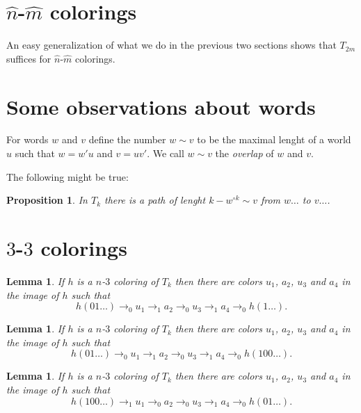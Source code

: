 \documentclass[a4paper]{article}
\newtheorem{lemma}[theorem]{Lemma}
\newtheorem{proposition}[theorem]{Proposition}
\begin{document}
\section{$\hat{n}$-$\hat{m}$ colorings}

An easy generalization of what we do in the previous two sections shows
that $T_{2m}$ suffices for $\hat{n}$-$\hat{m}$ colorings.


\section{Some observations about words}

\newcommand{\ol}[2]{{#1}\sim{#2}}

For words $w$ and $v$ define the number $\ol{w}{v}$ to be the maximal
lenght of a world $u$ such that $w = w' u$ and $v = u v'$. We call
$\ol{w}{v}$ the \emph{overlap} of $w$ and $v$.

The following might be true:
\begin{proposition}
 In $T_k$ there is a path of lenght $k - \ol{w^{\circ k}}{v}$ from $w\dots$ to $v\dots$.
\end{proposition}


\section{$3$-$3$ colorings}

\begin{lemma} \label{three one}
 If $h$ is a $n$-$3$ coloring of $T_k$ then there are colors $u_1$,
$a_2$, $u_3$ and $a_4$ in the image of $h$ such that
\[
 h(01\dots) \rightarrow_0 u_1 \rightarrow_1 a_2 \rightarrow_0 u_3
\rightarrow_1 a_4 \rightarrow_0 h(1\dots).
\]
\end{lemma}
\begin{lemma} \label{three one}
 If $h$ is a $n$-$3$ coloring of $T_k$ then there are colors $u_1$,
$a_2$, $u_3$ and $a_4$ in the image of $h$ such that
\[
 h(01\dots) \rightarrow_0 u_1 \rightarrow_1 a_2 \rightarrow_0 u_3
\rightarrow_1 a_4 \rightarrow_0 h(100\dots).
\]
\end{lemma}
\begin{lemma} \label{three one}
 If $h$ is a $n$-$3$ coloring of $T_k$ then there are colors $u_1$,
$a_2$, $u_3$ and $a_4$ in the image of $h$ such that
\[
 h(100\dots) \rightarrow_1 u_1 \rightarrow_0 a_2 \rightarrow_0 u_3
\rightarrow_1 a_4 \rightarrow_0 h(01\dots).
\]
\end{lemma}
\end{document}
